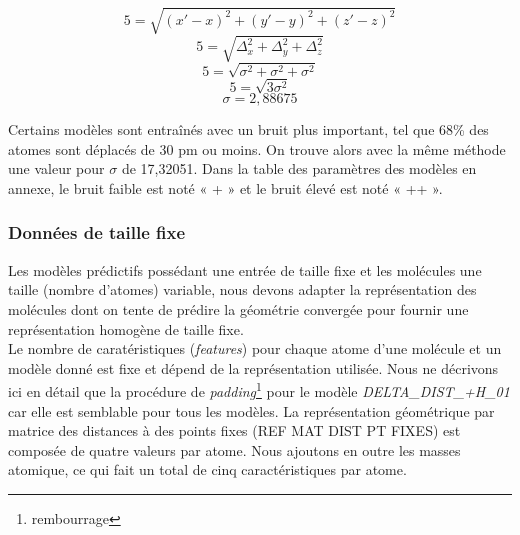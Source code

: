 \vspace{0.7cm}

\[
	5 = \sqrt{(x'-x)^2 + (y'-y)^2 + (z'-z)^2}
\]
\[
	5 = \sqrt{\Delta_x^2 + \Delta_y^2 + \Delta_z^2}
\]
\[
	5 = \sqrt{\sigma^2 + \sigma^2 + \sigma^2}
\]
\[
	5 = \sqrt{3\sigma^2}
\]
\[
	\sigma = 2,88675
\]

\vspace{0.7cm}

Certains modèles sont entraînés avec un bruit plus important, tel que 68\% des atomes sont déplacés de 30 pm ou moins. On trouve alors avec la même méthode une valeur pour $\sigma$ de 17,32051. Dans la table des paramètres des modèles en annexe, le bruit faible est noté « + » et le bruit élevé est noté « ++ ».

\subsubsection{Données de taille fixe}

Les modèles prédictifs possédant une entrée de taille fixe et les molécules une taille (nombre d'atomes) variable, nous devons adapter la représentation des molécules dont on tente de prédire la géométrie convergée pour fournir une représentation homogène de taille fixe.\\
Le nombre de caratéristiques (\emph{features}) pour chaque atome d'une molécule et un modèle donné est fixe et dépend de la représentation utilisée. Nous ne décrivons ici en détail que la procédure de \emph{padding}\footnote{rembourrage} pour le modèle \emph{DELTA\_DIST\_+H\_01} car elle est semblable pour tous les modèles.
La représentation géométrique par matrice des distances à des points fixes (REF MAT DIST PT FIXES) est composée de quatre valeurs par atome. Nous ajoutons en outre les masses atomique, ce qui fait un total de cinq caractéristiques par atome.
